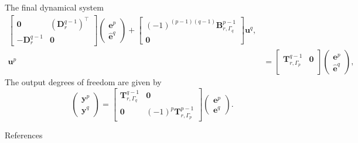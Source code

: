 \documentclass[aspectratio=169]{beamer}
\newcommand*{\dual}[1]{\ensuremath{\widehat{#1}}}
\newcommand{\backupend}{
	\addtocounter{framenumbervorappendix}{-\value{framenumber}}
	\addtocounter{framenumber}{\value{framenumbervorappendix}} 
}
\begin{document}
\begin{frame}{The final dynamical system}
\begin{equation*}
\begin{aligned}
			\begin{bmatrix}
				\mathbf{0} & (\mathbf{D}_r^{q-1})^\top\\
				-\mathbf{D}^{q-1}_r & \mathbf{0}
			\end{bmatrix}
			\begin{pmatrix}
				\mathbf{e}^p \\
				\dual{\mathbf{e}}^q
			\end{pmatrix} +
			\begin{bmatrix}
				(-1)^{(p-1)(q-1)}\mathbf{B}_{r, \Gamma_q}^{p-1} \\
				\mathbf{0}
			\end{bmatrix}\mathbf{u}^q, \\
			\mathbf{u}^p &= 
			\begin{bmatrix}
				\mathbf{T}^{q-1}_{r, \Gamma_p} & \mathbf{0} \\
			\end{bmatrix}
			\begin{pmatrix}
				\mathbf{e}^p \\
				\dual{\mathbf{e}}^q
			\end{pmatrix},
		\end{aligned}
	\end{equation*}
	The output degrees of freedom are given by
	\begin{equation*}
		\begin{pmatrix}
			\mathbf{y}^p \\
			\mathbf{y}^q
		\end{pmatrix} = 
		\begin{bmatrix}
			\mathbf{T}^{q-1}_{r, \Gamma_q} & \mathbf{0}\\
			\mathbf{0} & (-1)^p \mathbf{T}^{p-1}_{r, \Gamma_p}
		\end{bmatrix}
		\begin{pmatrix}
			\mathbf{e}^p \\
			\mathbf{e}^q
		\end{pmatrix}.
	\end{equation*}
\end{frame}


\begin{frame}[allowframebreaks]{References}
	\printbibliography
\end{frame}

\backupend
\end{document}
